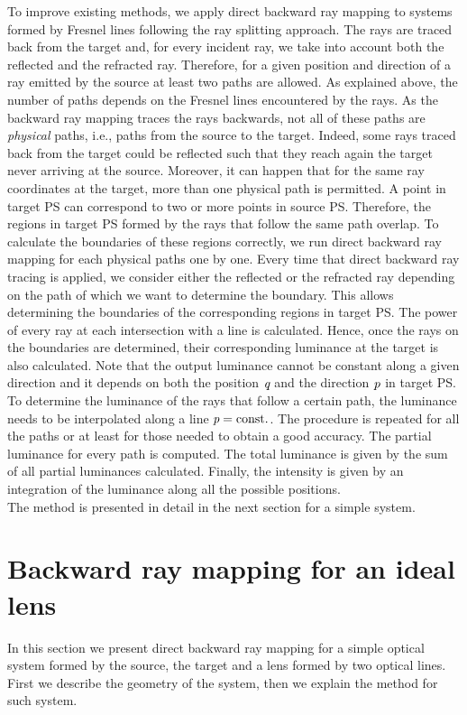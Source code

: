 To improve existing methods, we apply direct backward ray mapping to systems formed by Fresnel lines following the ray splitting approach. The rays are traced back from the target and, for every incident ray, we take into account both the reflected and the refracted ray. Therefore, for a given position and direction of a ray emitted by the source at least two paths are allowed. As explained above, the number of paths depends on the Fresnel lines encountered by the rays. As the backward ray mapping traces the rays backwards, not all of these paths are \textit{physical} paths, i.e., paths from the source to the target. Indeed, some rays traced back from the target could be reflected such that they reach again the target never arriving at the source. Moreover, it can happen that for the same ray coordinates at the target, more than one physical path is permitted. A point in target PS can correspond to two or more points in source PS. Therefore, the regions in target PS formed by the rays that follow the same path overlap. To calculate the boundaries of these regions correctly, we run direct backward ray mapping for each physical paths one by one. Every time that direct backward ray tracing is applied, we consider either the reflected or the refracted ray depending on the path of which we want to determine the boundary. This allows determining the boundaries of the corresponding regions in target PS. The power of every ray at each intersection with a line is calculated. Hence, once the rays on the boundaries are determined, their corresponding luminance at the target is also calculated. Note that the output luminance cannot be constant along a given direction and it depends on both the position $\textit{q}$ and the direction $\textit{p}$ in target PS. To determine the luminance of the rays that follow a certain path, the luminance needs to be interpolated along a line $\textit{p}= \textrm{const.}$. The procedure is repeated for all the paths or at least for those needed to obtain a good accuracy. The partial luminance for every path is computed.
The total luminance is given by the sum of all partial luminances calculated.
Finally, the intensity is given by an integration of the luminance along all the possible positions.
\\ \indent
The method is presented in detail in the next section for a simple system.
\section{Backward ray mapping for an ideal lens}
In this section we present direct backward ray mapping for a simple optical system formed by the source, the target and a lens formed by two optical lines.
First we describe the geometry of the system, then we explain the method for such system.
